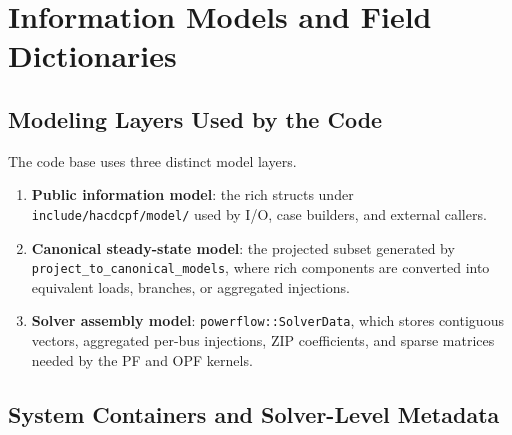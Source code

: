 \section{Information Models and Field Dictionaries}
\label{sec:components}

\subsection{Modeling Layers Used by the Code}

The code base uses three distinct model layers.
\begin{enumerate}
  \item \textbf{Public information model}: the rich structs under \texttt{include/hacdcpf/model/} used by I/O, case builders, and external callers.
  \item \textbf{Canonical steady-state model}: the projected subset generated by \texttt{project\_to\_canonical\_models}, where rich components are converted into equivalent loads, branches, or aggregated injections.
  \item \textbf{Solver assembly model}: \texttt{powerflow::SolverData}, which stores contiguous vectors, aggregated per-bus injections, ZIP coefficients, and sparse matrices needed by the PF and OPF kernels.
\end{enumerate}

\subsection{System Containers and Solver-Level Metadata}

